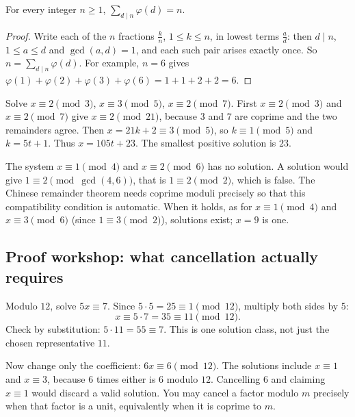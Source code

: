 \begin{proposition}[Gauss]\label{prop:phisum}
For every integer $n\ge1$, $\displaystyle\sum_{d\mid n}\varphi(d)=n$.
\end{proposition}
\begin{proof}
Write each of the $n$ fractions $\frac kn$, $1\le k\le n$, in lowest terms $\frac ad$: then $d\mid n$, $1\le a\le d$ and $\gcd(a,d)=1$, and each such pair arises exactly once. So $n=\sum_{d\mid n}\varphi(d)$. For example, $n=6$ gives $\varphi(1)+\varphi(2)+\varphi(3)+\varphi(6)=1+1+2+2=6$.
\end{proof}

\begin{examplex}
Solve $x\equiv 2\pmod 3$, $x\equiv 3\pmod 5$, $x\equiv 2\pmod 7$. First $x\equiv 2\pmod 3$ and $x\equiv 2\pmod 7$ give $x\equiv 2\pmod{21}$, because $3$ and $7$ are coprime and the two remainders agree. Then $x=21k+2\equiv 3\pmod 5$, so $k\equiv 1\pmod 5$ and $k=5t+1$. Thus $x=105t+23$. The smallest positive solution is $23$.
\end{examplex}

\begin{examplex}
The system $x\equiv 1\pmod 4$ and $x\equiv 2\pmod 6$ has no solution. A solution would give $1\equiv 2\pmod{\gcd(4,6)}$, that is $1\equiv 2\pmod 2$, which is false. The Chinese remainder theorem needs coprime moduli precisely so that this compatibility condition is automatic. When it holds, as for $x\equiv 1\pmod 4$ and $x\equiv 3\pmod 6$ (since $1\equiv 3\pmod 2$), solutions exist; $x=9$ is one.
\end{examplex}

\subsection*{Proof workshop: what cancellation actually requires}

Modulo $12$, solve $5x\equiv7$. Since
$5\cdot5=25\equiv1\pmod{12}$, multiply both sides by $5$:
\[
x\equiv5\cdot7=35\equiv11\pmod{12}.
\]
Check by substitution: $5\cdot11=55\equiv7$. This is one
solution class, not just the chosen representative $11$.

Now change only the coefficient: $6x\equiv6\pmod{12}$.
The solutions include $x\equiv1$ and $x\equiv3$, because
$6$ times either is $6$ modulo $12$. Cancelling $6$ and
claiming $x\equiv1$ would discard a valid solution. You may cancel a factor modulo $m$ precisely when that factor
is a unit, equivalently when it is coprime to $m$.

